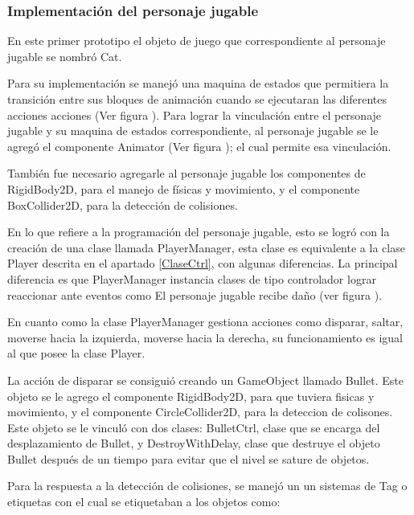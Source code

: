 \subsubsection{Implementación del personaje jugable}
En este primer prototipo el objeto de juego que correspondiente al personaje 
jugable se nombró Cat. 
\\
\par
Para su implementación se manejó una maquina de estados que permitiera la transición 
entre sus bloques de animación cuando se ejecutaran las diferentes acciones acciones 
(Ver figura ). 
Para lograr la vinculación entre el personaje jugable y su maquina de estados 
correspondiente, al personaje jugable se le agregó el componente Animator 
(Ver figura ); el cual permite esa vinculación.   
\\
\par 
También fue necesario agregarle al personaje jugable los componentes de 
RigidBody2D, para el manejo de físicas y movimiento, y el componente 
BoxCollider2D, para la detección de colisiones.
\\
\par 
En lo que refiere a la programación del personaje jugable, esto se logró con
la creación de una clase llamada PlayerManager, esta clase es equivalente a 
la clase Player descrita en el apartado \ref{ClaseCtrl}, con algunas diferencias.
La principal diferencia es que PlayerManager instancia clases de tipo controlador 
lograr reaccionar ante eventos como El personaje jugable recibe daño (ver figura ).
\\
\par 
En cuanto como la clase PlayerManager gestiona acciones como disparar, saltar, 
moverse hacia la izquierda, moverse hacia la derecha, su funcionamiento es igual
al que posee la clase Player.
\\
\par 
La acción de disparar se consiguió creando un GameObject llamado Bullet. 
Este objeto se le agrego el componente RigidBody2D, para que tuviera fisicas y 
movimiento, y el componente CircleCollider2D, para la deteccion de colisones. 
Este objeto se le vinculó con dos clases: BulletCtrl, clase que se 
encarga del desplazamiento de Bullet, y DestroyWithDelay, clase que destruye el 
objeto Bullet después de un tiempo para evitar que el nivel se sature de objetos.
\\
\par
Para la respuesta a la detección de colisiones, se manejó un un sistemas de Tag 
o etiquetas con el cual se etiquetaban a los objetos como: 
